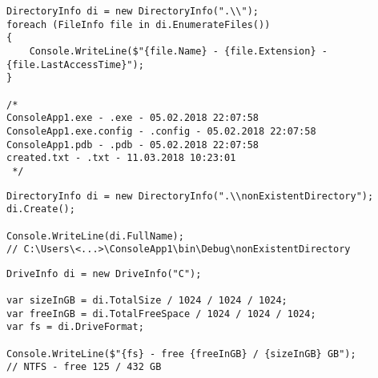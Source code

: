 \begin{frame}[fragile]
\begin{yesblock}
\begin{lstlisting}
DirectoryInfo di = new DirectoryInfo(".\\");
foreach (FileInfo file in di.EnumerateFiles())
{
    Console.WriteLine($"{file.Name} - {file.Extension} - {file.LastAccessTime}");
}

/*
ConsoleApp1.exe - .exe - 05.02.2018 22:07:58
ConsoleApp1.exe.config - .config - 05.02.2018 22:07:58
ConsoleApp1.pdb - .pdb - 05.02.2018 22:07:58
created.txt - .txt - 11.03.2018 10:23:01
 */
\end{lstlisting}
\end{yesblock}
\vfill
\begin{yesblock}
\begin{lstlisting}
DirectoryInfo di = new DirectoryInfo(".\\nonExistentDirectory");
di.Create();

Console.WriteLine(di.FullName);
// C:\Users\<...>\ConsoleApp1\bin\Debug\nonExistentDirectory
\end{lstlisting}
\end{yesblock}
\end{frame}



\begin{frame}[fragile]
\begin{yesblock}
\begin{lstlisting}
DriveInfo di = new DriveInfo("C");

var sizeInGB = di.TotalSize / 1024 / 1024 / 1024;
var freeInGB = di.TotalFreeSpace / 1024 / 1024 / 1024;
var fs = di.DriveFormat;

Console.WriteLine($"{fs} - free {freeInGB} / {sizeInGB} GB");
// NTFS - free 125 / 432 GB
\end{lstlisting}
\end{yesblock}
\end{frame}








